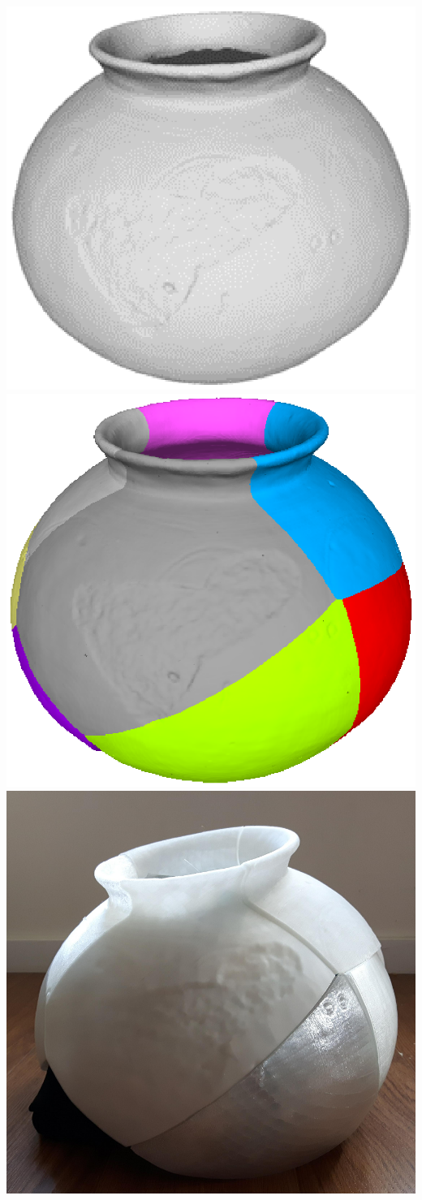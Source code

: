 \documentclass[acmlarge,screen]{acmart}
\begin{document}
%
\begin{teaserfigure}
 \includegraphics[width=.23\linewidth]{images/potscanned}
 \includegraphics[width=.23\linewidth]{images/puzzleparts}
  \includegraphics[width=.23\linewidth]{images/puzzleprinted}
  \caption{Seattle Mariners at Spring Training, 2010.}
  \label{fig:teaser}
\end{teaserfigure}

%
\maketitle
\end{document}
